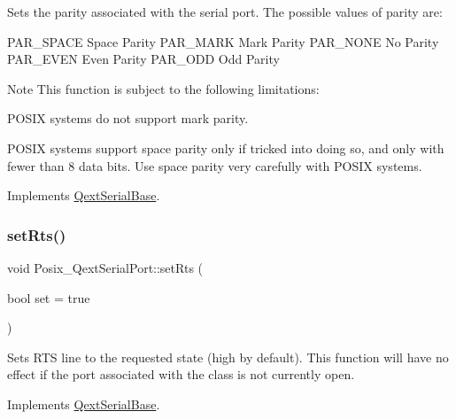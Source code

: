 Sets the parity associated with the serial port. The possible values of parity are\+: \begin{DoxyVerb}    PAR_SPACE       Space Parity
    PAR_MARK        Mark Parity
    PAR_NONE        No Parity
    PAR_EVEN        Even Parity
    PAR_ODD         Odd Parity
\end{DoxyVerb}


\begin{DoxyNote}{Note}
This function is subject to the following limitations\+: 
\end{DoxyNote}
\begin{DoxyParagraph}{}
P\+O\+S\+IX systems do not support mark parity. 
\end{DoxyParagraph}
\begin{DoxyParagraph}{}
P\+O\+S\+IX systems support space parity only if tricked into doing so, and only with fewer than 8 data bits. Use space parity very carefully with P\+O\+S\+IX systems. 
\end{DoxyParagraph}


Implements \mbox{\hyperlink{class_qext_serial_base}{Qext\+Serial\+Base}}.

\mbox{\label{class_posix___qext_serial_port_aa099a4b3f406cf017e1dfe55da3a2c6a}} 
\subsubsection{\texorpdfstring{set\+Rts()}{setRts()}}
{\footnotesize\ttfamily void Posix\+\_\+\+Qext\+Serial\+Port\+::set\+Rts (\begin{DoxyParamCaption}\item[{bool}]{set = {\ttfamily true} }\end{DoxyParamCaption})\hspace{0.3cm}{\ttfamily [virtual]}}

Sets R\+TS line to the requested state (high by default). This function will have no effect if the port associated with the class is not currently open. 

Implements \mbox{\hyperlink{class_qext_serial_base}{Qext\+Serial\+Base}}.

\mbox{\label{class_posix___qext_serial_port_a34b54ac1bef6090010bf00a45dc173fe}} 
